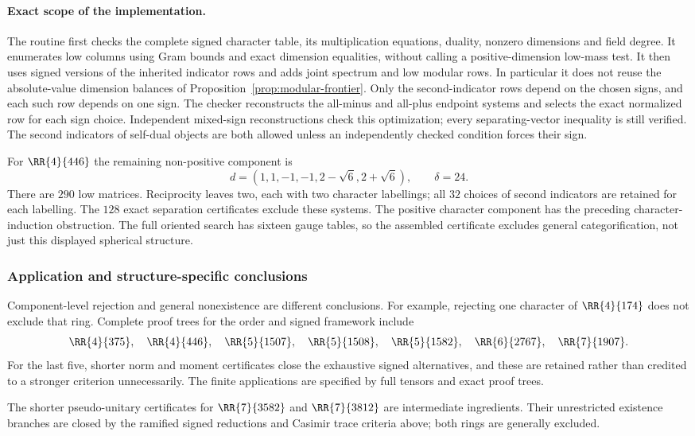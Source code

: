 \paragraph{Exact scope of the implementation.}
The routine first checks the complete signed character table, its
multiplication equations, duality, nonzero dimensions and field degree.
It enumerates low columns using Gram bounds and exact dimension
equalities, without calling a positive-dimension low-mass test. It then
uses signed versions of the inherited indicator rows and adds joint
spectrum and low modular rows. In particular it does not reuse the
absolute-value dimension balances of
Proposition~\ref{prop:modular-frontier}. Only the second-indicator rows depend on the chosen signs, and each such row depends on one sign. The checker reconstructs the all-minus and all-plus endpoint systems and selects the exact normalized row for each sign choice. Independent mixed-sign reconstructions check this optimization; every separating-vector inequality is still verified. The second indicators of
self-dual objects are both allowed unless an independently checked
condition forces their sign.

For $\RR{4}{446}$ the remaining non-positive component is
\[
 d=(1,1,-1,-1,2-\sqrt6,2+\sqrt6),\qquad\delta=24.
\]
There are $290$ low matrices. Reciprocity leaves two, each with two
character labellings; all $32$ choices of second indicators are retained
for each labelling. The $128$ exact separation certificates exclude
these systems. The positive character component has the preceding
character-induction obstruction. The full oriented search has sixteen
gauge tables, so the assembled certificate excludes general
categorification, not just this displayed spherical structure.

\subsubsection{Application and structure-specific conclusions}
Component-level rejection and general nonexistence are different
conclusions. For example, rejecting one character of $\RR{4}{174}$ does
not exclude that ring. Complete proof trees for the order and signed
framework include
\[
 \RR{4}{375},\quad\RR{4}{446},\quad
 \RR{5}{1507},\quad\RR{5}{1508},\quad\RR{5}{1582},\quad
 \RR{6}{2767},\quad\RR{7}{1907}.
\]
For the last five, shorter norm and moment certificates close the
exhaustive signed alternatives, and these are retained rather than
credited to a stronger criterion unnecessarily. The finite applications
are specified by full tensors and exact proof trees.

The shorter pseudo-unitary certificates for $\RR{7}{3582}$ and
$\RR{7}{3812}$ are intermediate ingredients. Their unrestricted
existence branches are closed by the ramified signed reductions and
Casimir trace criteria above; both rings are generally excluded.



